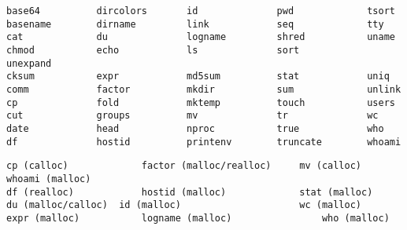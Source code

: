 \begin{minipage}{\linewidth}
\begin{lstlisting}[label={lst:coreutils},caption={GNU Core Utilities tested}]
base64          dircolors       id              pwd             tsort
basename        dirname         link            seq             tty
cat             du              logname         shred           uname
chmod           echo            ls              sort            unexpand
cksum           expr            md5sum          stat            uniq
comm            factor          mkdir           sum             unlink
cp              fold            mktemp          touch           users
cut             groups          mv              tr              wc
date            head            nproc           true            who
df              hostid          printenv        truncate        whoami
\end{lstlisting}
\end{minipage}

\begin{lstlisting}[label={lst:coreutils_crashes},caption={Crashes in GNU Core Utilities}]
cp (calloc)				factor (malloc/realloc)		mv (calloc)       whoami (malloc)
df (realloc)			hostid (malloc)		    	stat (malloc)      
du (malloc/calloc)	id (malloc)						wc (malloc)
expr (malloc)			logname (malloc)				who (malloc)			
\end{lstlisting}